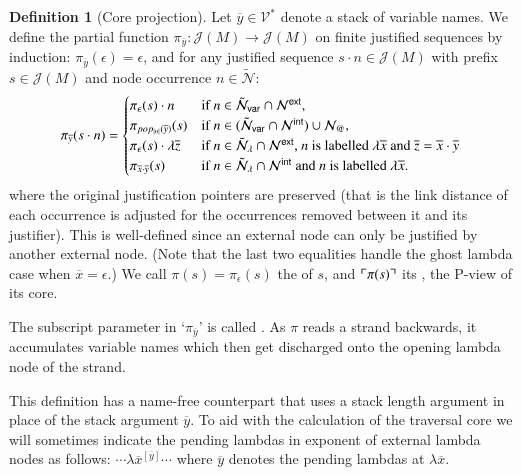\documentclass{elsarticle}
\makeatletter
\newif\iflongversion
\theoremstyle{plain}
\theoremstyle{definition}
\newtheorem{definition}{Definition}[section]
\newcommand\VarSet{\mathcal{V}}
\newcommand\Nodes{\mathcal{N}}%
\newcommand\NodesApp{\Nodes_@}%
\newcommand{\ghostlmd}{{\lambda\mkern-7mu \lambda}}
\newcommand\ExtendedNodes{\tilde{\Nodes}}
\newcommand\ExtendedNodesVar{\tilde{\Nodes}_{\sf var}}
\newcommand\ExtendedNodesLmd{\tilde{\Nodes}_{\lambda}}
\def\coresymbol{\pi} %
\newcommand{\core}[1]{\coresymbol(#1)} %
\newcommand{\ExternalNodes}{\Nodes^{\sf ext}}
\newcommand{\InternalNodes}{\Nodes^{\sf int}}
\def\justseqset{\mathcal{J}}
\makeatother
\begin{document}
\begin{definition}[Core projection]
\label{def:coreprojection}
Let $\overline{y} \in \VarSet^*$ denote a stack of variable names.
We define the partial function $\coresymbol_{\overline{y}}\colon \justseqset(M) \longrightarrow \justseqset(M)$ on finite justified sequences by induction: $\coresymbol_{\overline{y}}(\epsilon) = \epsilon$, and for any justified sequence $s \cdot n\in\justseqset(M)$ with prefix $s \in \justseqset(M)$ and node occurrence $n\in\ExtendedNodes$:
\begin{equation*}
\coresymbol_{\overline{y}}(s\cdot n) =
\begin{cases}
    \coresymbol_{\epsilon}(s) \cdot n
    & \mbox{if } n\in\ExtendedNodesVar\inter\ExternalNodes, \\
     \coresymbol_{pop_{|n|}(\overline{y})}(s)
    & \mbox{if } n\in(\ExtendedNodesVar\inter\InternalNodes)\union\NodesApp, \\
    \coresymbol_{\epsilon}(s) \cdot \lambda \overline{z}
    & \mbox{if $n  \in\ExtendedNodesLmd\inter\ExternalNodes$,
     $n$ is labelled $\lambda\overline{x}$ and $\overline{z}=\overline{x}\cdot\overline{y}$} \\
    \coresymbol_{\overline{x} \cdot \overline{y}}(s)
    & \mbox{if $n \in\ExtendedNodesLmd\inter\InternalNodes$
         and $n$ is labelled $\lambda\overline{x}$.}
\end{cases}
\end{equation*}
where the original justification pointers are preserved (that is the link distance of each occurrence is adjusted for the occurrences removed between it and its justifier). This is well-defined since an external node can only be justified by another external node. (Note that the last two equalities handle the ghost lambda case when $\overline{x}=\epsilon$.)
We call $\core{s} = \coresymbol_\epsilon(s)$ the  of $s$,
and $\pview{\core{s}}$ its , the P-view of its core.
\end{definition}

The subscript parameter in `$\coresymbol_{\overline{y}}$' is called . As $\coresymbol$ reads a strand backwards, it accumulates variable names which then get discharged onto the opening lambda node of the strand.
\iflongversion
So in words, the \emph{core projection} is the sub-sequence obtained by removing all internal nodes and discharging on each external lambda node the stack of \emph{pending lambdas} at that point.
\fi
This definition has a name-free counterpart that uses a stack length argument in place of the stack argument $\overline{y}$.
%
To aid with the calculation of the traversal core we will sometimes indicate the pending lambdas in exponent of external lambda nodes as follows:
$\cdots  \lambda\overline{x}^{[\overline{y}]} \cdots$ where $\overline{y}$ denotes the pending lambdas at $\lambda\overline{x}$.
\end{document}
